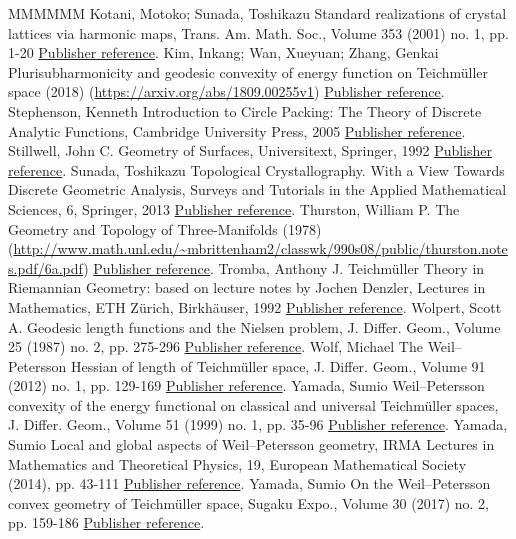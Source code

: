 \documentclass[11pt]{article}
\theoremstyle{definition}
\numberwithin{equation}{section}
\begin{document}
\begin{thebibliography}{MMMMMM}
 Kotani, Motoko; Sunada, Toshikazu Standard realizations of crystal lattices via harmonic maps, Trans. Am. Math. Soc., Volume 353 (2001) no. 1, pp. 1-20 \href{https://ahl.centre-mersenne.org/item/AHL_2021__4__1767_0/#KotaniSunadaStandard}{Publisher reference}.
 Kim, Inkang; Wan, Xueyuan; Zhang, Genkai Plurisubharmonicity and geodesic convexity of energy function on Teichmüller space (2018) (\url{https://arxiv.org/abs/1809.00255v1}) \href{https://ahl.centre-mersenne.org/item/AHL_2021__4__1767_0/#Kim_et_al}{Publisher reference}.
 Stephenson, Kenneth Introduction to Circle Packing: The Theory of Discrete Analytic Functions, Cambridge University Press, 2005 \href{https://ahl.centre-mersenne.org/item/AHL_2021__4__1767_0/#Stephenson}{Publisher reference}.
 Stillwell, John C. Geometry of Surfaces, Universitext, Springer, 1992 \href{https://ahl.centre-mersenne.org/item/AHL_2021__4__1767_0/#Stillwell}{Publisher reference}.
 Sunada, Toshikazu Topological Crystallography. With a View Towards Discrete Geometric Analysis, Surveys and Tutorials in the Applied Mathematical Sciences, 6, Springer, 2013 \href{https://ahl.centre-mersenne.org/item/AHL_2021__4__1767_0/#SunadaTopological}{Publisher reference}.
 Thurston, William P. The Geometry and Topology of Three-Manifolds (1978) (\url{http://www.math.unl.edu/~mbrittenham2/classwk/990s08/public/thurston.notes.pdf/6a.pdf}) \href{https://ahl.centre-mersenne.org/item/AHL_2021__4__1767_0/#Thurston}{Publisher reference}.
 Tromba, Anthony J. Teichmüller Theory in Riemannian Geometry: based on lecture notes by Jochen Denzler, Lectures in Mathematics, ETH Zürich, Birkhäuser, 1992 \href{https://ahl.centre-mersenne.org/item/AHL_2021__4__1767_0/#TrombaBook}{Publisher reference}.
 Wolpert, Scott A. Geodesic length functions and the Nielsen problem, J. Differ. Geom., Volume 25 (1987) no. 2, pp. 275-296 \href{https://ahl.centre-mersenne.org/item/AHL_2021__4__1767_0/#WolpertNielsen}{Publisher reference}.
 Wolf, Michael The Weil–Petersson Hessian of length of Teichmüller space, J. Differ. Geom., Volume 91 (2012) no. 1, pp. 129-169 \href{https://ahl.centre-mersenne.org/item/AHL_2021__4__1767_0/#Wolf}{Publisher reference}.
 Yamada, Sumio Weil–Petersson convexity of the energy functional on classical and universal Teichmüller spaces, J. Differ. Geom., Volume 51 (1999) no. 1, pp. 35-96 \href{https://ahl.centre-mersenne.org/item/AHL_2021__4__1767_0/#Yamada}{Publisher reference}.
 Yamada, Sumio Local and global aspects of Weil–Petersson geometry, IRMA Lectures in Mathematics and Theoretical Physics, 19, European Mathematical Society (2014), pp. 43-111 \href{https://ahl.centre-mersenne.org/item/AHL_2021__4__1767_0/#Yamada2}{Publisher reference}.
 Yamada, Sumio On the Weil–Petersson convex geometry of Teichmüller space, Sugaku Expo., Volume 30 (2017) no. 2, pp. 159-186 \href{https://ahl.centre-mersenne.org/item/AHL_2021__4__1767_0/#YamadaSugaku}{Publisher reference}.
\end{thebibliography}
\end{document}
